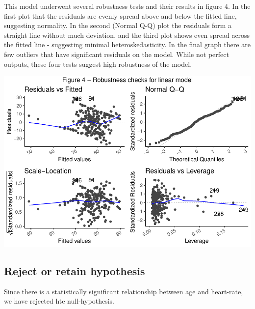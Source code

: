 \documentclass[preprint, 3p,
authoryear]{elsarticle} %
\begin{document}
This model underwent several robustness tests and their results in
figure 4. In the first plot that the residuals are evenly spread above
and below the fitted line, suggesting normality. In the second (Normal
Q-Q) plot the residuals form a straight line without much deviation, and
the third plot shows even spread across the fitted line - suggesting
minimal heteroskedasticity. In the final graph there are few outliers
that have significant residuals on the model. While not perfect outputs,
these four tests suggest high robustness of the model.

\includegraphics{assignment_2_files/figure-latex/unnamed-chunk-12-1.pdf}

\hypertarget{reject-or-retain-hypothesis-3}{%
\subsection{Reject or retain
hypothesis}\label{reject-or-retain-hypothesis-3}}

Since there is a statistically significant relationship between age and
heart-rate, we have rejected hte null-hypothesis.
\end{document}
